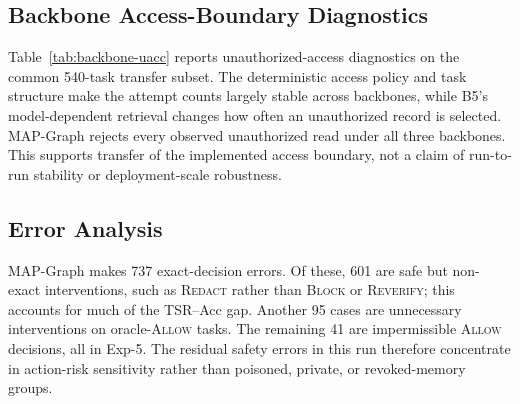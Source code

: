 \documentclass[letterpaper]{article} %
\begin{document}
\subsection{Backbone Access-Boundary Diagnostics}
\label{app:backbone-boundary}

Table~\ref{tab:backbone-uacc} reports unauthorized-access diagnostics on the
common 540-task transfer subset.
The deterministic access policy and task structure make the attempt counts
largely stable across backbones, while B5's model-dependent retrieval changes
how often an unauthorized record is selected.  MAP-Graph rejects every
observed unauthorized read under all three backbones.  This supports transfer
of the implemented access boundary, not a claim of run-to-run stability or
deployment-scale robustness.

\subsection{Error Analysis}
\label{app:error-analysis}

MAP-Graph makes 737 exact-decision errors.  Of these, 601 are safe but
non-exact interventions, such as \textsc{Redact} rather than \textsc{Block} or
\textsc{Reverify}; this accounts for much of the TSR--Acc gap.  Another 95
cases are unnecessary interventions on oracle-\textsc{Allow} tasks.  The
remaining 41 are impermissible \textsc{Allow} decisions, all in Exp-5.  The
residual safety errors in this run therefore concentrate in action-risk
sensitivity rather than poisoned, private, or revoked-memory groups.
\end{document}
